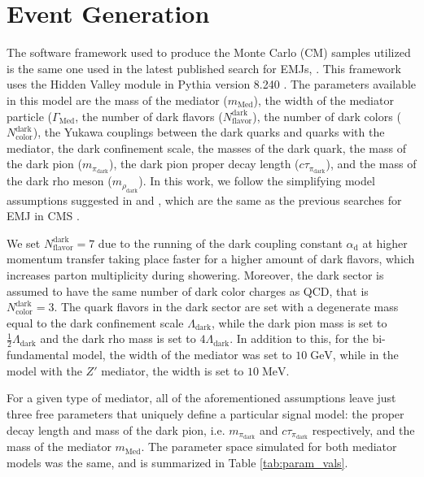 \chapter{Event Generation}

The software framework used to produce the Monte Carlo (CM) samples utilized is the same one used in the latest published search for EMJs, \cite{cmscollaborationSearchNewPhysics2024}. This framework uses the Hidden Valley module \cite{carloniVisibleEffectsInvisible2010, carloniDiscerningSecludedSector2011} in Pythia version 8.240 \cite{sjostrandIntroductionPYTHIA822015}. The parameters available in this model are the mass of the mediator ($m_{\text{Med}}$), the width of the mediator particle ($\Gamma_{\text{Med}}$, the number of dark flavors ($N_{\text{flavor}}^\text{dark}$), the number of dark colors ($N_{\text{color}}^\text{dark}$), the Yukawa couplings between the dark quarks and quarks with the mediator, the dark confinement scale, the masses of the dark quark, the mass of the dark pion ($m_{\pi_{\text{dark}}}$), the dark pion proper decay length ($c\tau_{\pi_{\text{dark}}}$), and the mass of the dark rho meson ($m_{\rho_{\text{dark}}}$). In this work, we follow the simplifying model assumptions suggested in \cite{baiScaleDarkQCD2014} and \cite{schwallerEmergingJets2015}, which are the same as the previous searches for EMJ in CMS \cite{cmscollaborationSearchNewParticles2019, cmscollaborationSearchNewPhysics2024}. 

We set $N_{\text{flavor}}^{\text{dark}} = 7$ due to the running of the dark coupling constant $\alpha_{\text{d}}$ at higher momentum transfer taking place faster for a higher amount of dark flavors, which increases parton multiplicity during showering. Moreover, the dark sector is assumed to have the same number of dark color charges as QCD, that is $N_{\text{color}}^{\text{dark}} = 3$. The quark flavors in the dark sector are set with a degenerate mass equal to the dark confinement scale $\Lambda_{\text{dark}}$, while the dark pion mass is set to $\frac12 \Lambda_{\text{dark}}$ and the dark rho mass is set to $4\Lambda_{\text{dark}}$. In addition to this, for the bi-fundamental model, the width of the mediator was set to $10\;\text{GeV}$, while in the model with the $Z'$ mediator, the width is set to $10\;\text{MeV}$.

For a given type of mediator, all of the aforementioned assumptions leave just three free parameters that uniquely define a particular signal model: the proper decay length and mass of the dark pion, i.e. $m_{\pi_{\text{dark}}}$ and $c\tau_{\pi_{\text{dark}}}$ respectively, and the mass of the mediator $m_{\text{Med}}$. The parameter space simulated for both mediator models was the same, and is summarized in Table \ref{tab:param_vals}.

